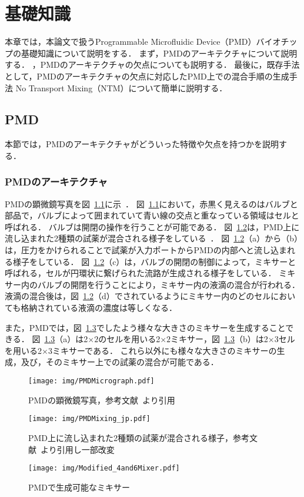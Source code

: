 \chapter{基礎知識}
本章では，本論文で扱うProgrammable Microfluidic Device（PMD）バイオチップの基礎知識について説明をする．
まず，PMDのアーキテクチャについて説明する．
，PMDのアーキテクチャの欠点についても説明する．
最後に，既存手法として，PMDのアーキテクチャの欠点に対応したPMD上での混合手順の生成手法
No Transport Mixing（NTM）について簡単に説明する．
\section{PMD}
\label{PMD}
本節では，PMDのアーキテクチャがどういった特徴や欠点を持つかを説明する．
\subsection{PMDのアーキテクチャ}
\label{arc}
PMDの顕微鏡写真を図~\ref{fig:micrograph}に示~\cite{1}．
図~\ref{fig:micrograph}において，赤黒く見えるのはバルブと部品で，バルブによって囲まれていて青い線の交点と重なっている領域はセルと呼ばれる．
バルブは開閉の操作を行うことが可能である．
図~\ref{fig:mixing}は，PMD上に流し込まれた2種類の試薬が混合される様子をしている~\cite{4}．
図~\ref{fig:mixing}（a）から（b）は，圧力をかけられることで試薬が入力ポートからPMDの内部へと流し込まれる様子をしている．
図~\ref{fig:mixing}（c）は，バルブの開閉の制御によって，ミキサーと呼ばれる，セルが円環状に繋げられた流路が生成される様子をしている．
ミキサー内のバルブの開閉を行うことにより，ミキサー内の液滴の混合が行われる．
液滴の混合後は，図~\ref{fig:mixing}（d）でされているようにミキサー内のどのセルにおいても格納されている液滴の濃度は等しくなる．

また，PMDでは，図~\ref{fig:4and6Mixer}でしたよう様々な大きさのミキサーを生成することできる．
図~\ref{fig:4and6Mixer}（a）は2$\times2$のセルを用いる2$\times2$ミキサー，図~\ref{fig:4and6Mixer}（b）は2$\times$3セルを用いる2$\times$3ミキサーである．
これら以外にも様々な大きさのミキサーの生成，及び，そのミキサー上での試薬の混合が可能である．
\begin{figure}[tbp]
 \centering\texttt{[image: img/PMDMicrograph.pdf]}
 \caption{PMDの顕微鏡写真，参考文献~\cite{1}より引用}\label{fig:micrograph}
\end{figure}
\begin{figure}[tbp]
 \centering\texttt{[image: img/PMDMixing\_jp.pdf]}
    \caption{PMD上に流し込まれた2種類の試薬が混合される様子，参考文献~\cite{4}より引用し一部改変}\label{fig:mixing}
\end{figure}
\begin{figure}[tbp]
    \centering\texttt{[image: img/Modified\_4and6Mixer.pdf]}
 \caption{PMDで生成可能なミキサー}\label{fig:4and6Mixer}
\end{figure}
\newpage
